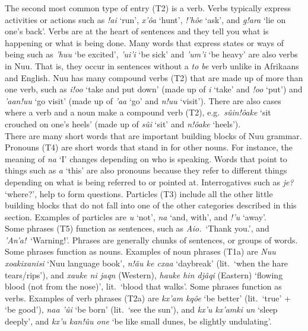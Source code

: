 The second most common type of entry (T2) is a verb. Verbs typically
express activities or actions such as \emph{!ai} `run',
\emph{\textipa{\textvertline}x'\^{o}a} `hunt', \emph{!'h\^{o}e} `ask',
and \emph{g!ara} `lie on one's back'. Verbs are at the heart of
sentences and they tell you what is happening or what is being done.
Many words that express states or ways of being such as
\emph{\textipa{\textdoublevertline}'huu} `be excited',
\emph{'ui'i} `be sick' and
\emph{\textipa{\textdoublevertline}'um'i} `be heavy' are also verbs in
N\textipa{\textvertline}uu. That is, they occur in sentences without a
\emph{to be} verb unlike in Afrikaans and English. N\textipa{\textvertline}uu
has many compound verbs (T2) that are made up of more than one verb,
such as \emph{\textipa{\textvertline}i!oo} `take and put down' (made
up of \emph{\textipa{\textvertline}i} `take' and \emph{!oo} `put') and
\emph{\textipa{\textdoublevertline}'aan!uu} `go visit' (made up of
\emph{\textipa{\textdoublevertline}'aa} `go' and \emph{n!uu} `visit').
There are also cases where a verb and a noun make a compound verb
(T2), e.g.\ \emph{s\^{u}in!\^{o}ake} `sit crouched on one's heels'
(made up of \emph{s\^{u}i} `sit' and \emph{n!\^{o}ake} `heels').\\

There are many short words that are important building blocks of
N\textipa{\textvertline}uu grammar. Pronouns (T4) are short words that
stand in for other nouns. For instance, the meaning of \emph{na} `I'
changes depending on who is speaking. Words that point to things such
as \emph{a} `this' are also pronouns because they refer to different
things depending on what is being referred to or pointed at.
Interrogatives such as \emph{je?} `where?', help to form questions.
Particles (T3) include all the other little building blocks that do
not fall into one of the other categories described in this section.
Examples of particles are \emph{\textipa{\textdoublevertline}u} `not',
\emph{n\textipa{\textvertline}a} `and, with', and \emph{!'u} `away'.\\

Some phrases (T5) function as sentences, such as \emph{Aio.}\ `Thank
you.', and \emph{\textipa{\textdoublebarpipe}'An'a!}\ `Warning!'.
Phrases are generally chunks of sentences, or groups of words. Some
phrases function as nouns. Examples of noun phrases (T1a) are
\emph{N\textipa{\textvertline}uu
\textipa{\textdoublebarpipe}xoaki\textipa{\textdoublebarpipe}xanisi}
`N\textipa{\textvertline}uu language book', \emph{n!\^{a}u ke cxaa}
`daybreak' (lit.\ `when the hare tears/rips'), and
\emph{\textipa{\textdoublevertline}xauke ni jaqn} (Western),
\emph{\textipa{\textdoublevertline}hauke hin dj\^{a}qi} (Eastern)
`flowing blood (not from the nose)', lit.\ `blood that walks'. Some
phrases function as verbs. Examples of verb phrases (T2a) are
\emph{kx'am kq\^{o}e} `be better' (lit.\ `true' + `be good'),
\emph{n\textipa{\textvertline}aa \textipa{\textdoublevertline}'\^{u}i}
`be born' (lit.\ `see the sun'), and \emph{kx'u kx'amki
un} `sleep deeply', and \emph{kx'u kan!\^{u}u
one} `be like small dunes, be slightly undulating'.\\

